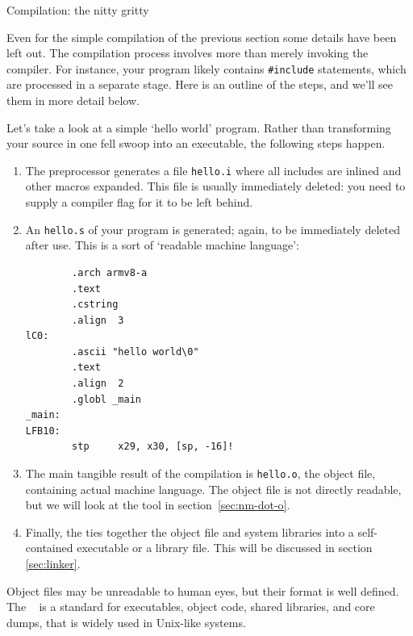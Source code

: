  {Compilation: the nitty gritty}
\label{sec:assem-out}

Even for the simple compilation of the previous section
some details have been left out.
The compilation process involves more than merely invoking the compiler.
For instance, your program likely contains \lstinline{#include} statements,
which are processed in a separate stage.
Here is an outline of the steps, and we'll see them in more detail below.

Let's take a look at a simple `hello world' program.
Rather than transforming your source in one fell swoop into an executable,
the following steps happen.
\begin{enumerate}
\item The preprocessor generates
  a file \lstinline{hello.i} where all includes are inlined
  and other macros
  expanded.
  This file is usually immediately deleted: you need to supply
  a compiler flag for it to be left behind.
\item An  \lstinline{hello.s} of your program
  is generated; again, to be immediately deleted after use.
  This is a sort of `readable machine language':
\begin{lstlisting}
        .arch armv8-a
        .text
        .cstring
        .align  3
lC0:
        .ascii "hello world\0"
        .text
        .align  2
        .globl _main
_main:
LFB10:
        stp     x29, x30, [sp, -16]!    
\end{lstlisting}
\item The main tangible result of the compilation is \lstinline{hello.o},
  the object file, containing actual machine language.
  The object file is not directly readable, but we 
  will look at the  tool 
  in section~\ref{sec:nm-dot-o}.
\item Finally, the  ties together the object file
  and system libraries into a self-contained executable or a library file.
  This will be discussed in section \ref{sec:linker}.
\end{enumerate}

\begin{remark}
  Object files may be unreadable to human eyes, but their format
  is well defined.
  The ~\cite{ELF-wikipedia} is a standard 
  for executables, object code, shared libraries, and core dumps,
  that is widely used in Unix-like systems.
\end{remark}

